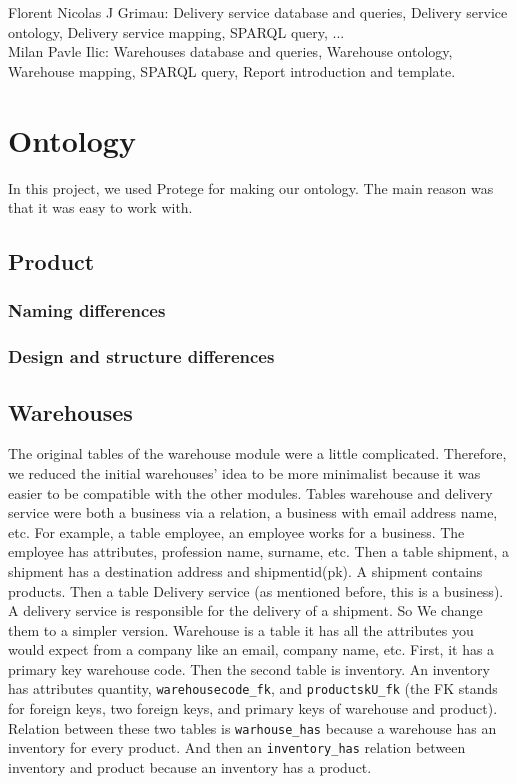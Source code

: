 \documentclass{article}
\begin{document}
\noindent Florent Nicolas J Grimau: Delivery service database and queries, Delivery service ontology, Delivery service mapping, SPARQL query, ...
\\

\noindent Milan Pavle Ilic: Warehouses database and queries, Warehouse ontology, Warehouse mapping, SPARQL query, Report introduction and template.



\section{Ontology}
In this project, we used Protege for making our ontology. The main reason was that it was easy to work with.


\subsection{Product}
\subsubsection{Naming differences}
\subsubsection{Design and structure differences}



\subsection{Warehouses}
The original tables of the warehouse module were a little complicated. Therefore, we reduced the initial warehouses' idea to be more minimalist because it was easier to be compatible with the other modules. Tables warehouse and delivery service were both a business via a relation, a business with email address name, etc. For example, a table employee, an employee works for a business. The employee has attributes, profession name, surname, etc. Then a table shipment, a shipment has a destination address and shipmentid(pk). A shipment contains products. Then a table Delivery service (as mentioned before, this is a business). A delivery service is responsible for the delivery of a shipment. So We change them to a simpler version. Warehouse is a table it has all the attributes you would expect from a company like an email, company name, etc. First, it has a primary key warehouse code. Then the second table is inventory. An inventory has attributes quantity, \texttt{warehousecode\_fk}, and \texttt{productskU\_fk} (the FK stands for foreign keys, two foreign keys, and primary keys of warehouse and product). Relation between these two tables is \texttt{warhouse\_has} because a warehouse has an inventory for every product. And then an \texttt{inventory\_has} relation between inventory and product because an inventory has a product.
\end{document}
